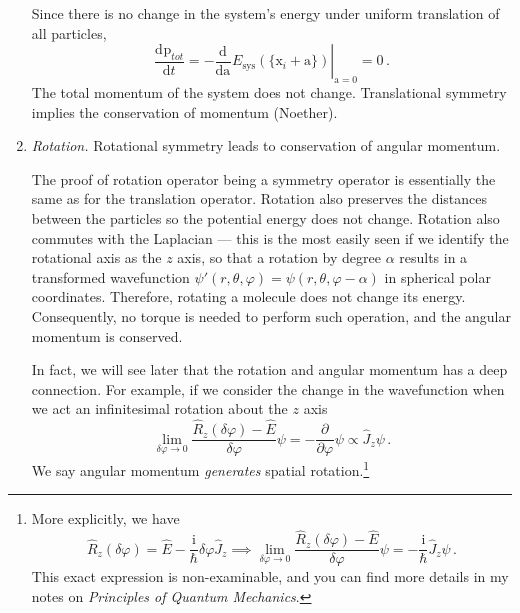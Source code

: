 \documentclass{article}
\theoremstyle{plain}\theoremheaderfont{\normalfont\itshape}\theorembodyfont{\rmfamily}\theoremseparator{.}\newtheorem*{rem}{Remark}\newtheorem*{ex}{Example}\newtheorem*{proof}{Proof}\newtheorem*{altp}{Alternative proof}
\theoremstyle{plain}\theoremheaderfont{\normalfont\bfseries}\theorembodyfont{\rmfamily}\theoremseparator{.}\newtheorem{thm}{Theorem}[section]\newtheorem{lem}[thm]{Lemma}\newtheorem{prop}[thm]{Proposition}\newtheorem*{cor}{Corollary}\newtheorem{defn}[thm]{Definition}\newtheorem{clm}[thm]{Claim}\newtheorem{clminproof}{Claim}\newtheorem*{law}{Law}\newtheorem{pos}[thm]{Postulate}
\theoremstyle{break}\theoremheaderfont{\normalfont\itshape}\theorembodyfont{\rmfamily}\theoremseparator{.\medskip}\newtheorem*{proofskip}{Proof}\newtheorem*{exs}{Examples}\newtheorem*{rems}{Remarks}
\theoremstyle{break}\theoremheaderfont{\normalfont\bfseries}\theorembodyfont{\rmfamily}\theoremseparator{.\medskip}\newtheorem{lemskip}[thm]{Lemma}\newtheorem{defnskip}[thm]{Definition}\newtheorem{propskip}[thm]{Proposition}\newtheorem{thmskip}[thm]{Theorem}
\numberwithin{equation}{section}
\newcommand{\ii}{\mathrm{i}}
\newcommand{\dv}[3][]{\frac{\mathrm{d}^{#1} #2}{{\mathrm{d} #3}^{#1}}}
\newcommand{\pdv}[3][]{\frac{\partial^{#1} #2}{{\partial #3}^{#1}}}
\newcommand{\vb}[1]{\bm{\mathrm{#1}}}
\begin{document}
\begin{enumerate}[topsep=0pt,label=(\roman*)]
        Since there is no change in the system's energy under uniform translation of all particles,
        \begin{equation}
            \dv{\vb{p}_{tot}}{t}=-\left.\dv{}{\vb{a}} E_{\text{sys}}(\{\vb{x}_i+\vb{a}\})\right|_{\vb{a}=\vb{0}}=\vb{0}\,.
        \end{equation}
        The total momentum of the system does not change. Translational symmetry implies the conservation of momentum (Noether).

        \item \textit{Rotation.} Rotational symmetry leads to conservation of angular momentum.
        
        The proof of rotation operator being a symmetry operator is essentially the same as for the translation operator. Rotation also preserves the distances between the particles so the potential energy does not change. Rotation also commutes with the Laplacian --- this is the most easily seen if we identify the rotational axis as the \(z\) axis, so that a rotation by degree \(\alpha\) results in a transformed wavefunction \(\psi'(r,\theta,\varphi)=\psi(r,\theta,\varphi-\alpha)\) in spherical polar coordinates. Therefore, rotating a molecule does not change its energy. Consequently, no torque is needed to perform such operation, and the angular momentum is conserved.

        In fact, we will see later that the rotation and angular momentum has a deep connection. For example, if we consider the change in the wavefunction when we act an infinitesimal rotation about the \(z\) axis
        \begin{equation}
            \lim_{\delta\varphi\to 0}\frac{\hat{R}_z(\delta\varphi)-\hat{E}}{\delta\varphi}\psi=-\pdv{}{\varphi}\psi\propto \hat{J}_z\psi\,.
        \end{equation}
        We say angular momentum \textit{generates} spatial rotation.\footnote{More explicitly, we have
        \begin{equation}
            \hat{R}_z(\delta\varphi)=\hat{E}-\frac{\ii}{\hbar}\delta\varphi\hat{J}_z\implies \lim_{\delta\varphi\to 0}\frac{\hat{R}_z(\delta\varphi)-\hat{E}}{\delta\varphi}\psi=-\frac{\ii}{\hbar}\hat{J}_z\psi\,.
        \end{equation}
        This exact expression is non-examinable, and you can find more details in my notes on \textit{Principles of Quantum Mechanics}.}
    \end{enumerate}
\end{document}
